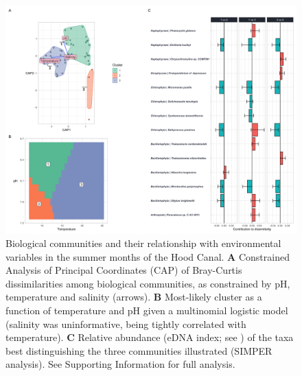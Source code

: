 \documentclass[11pt]{article}
\begin{document}
\begin{linenumbers}
\\




\begin{figure}%
\centering
\includegraphics[width=1\linewidth]{	Figures_for_MS/Figure2.2020-09-03.png}
\caption{\footnotesize{Biological communities and their relationship with environmental variables in the summer months of the Hood Canal. \textbf{A} Constrained Analysis of Principal Coordinates (CAP) of Bray-Curtis dissimilarities among biological communities, as constrained by pH, temperature and salinity (arrows). \textbf{B} Most-likely cluster as a function of temperature and pH given a multinomial logistic model (salinity was uninformative, being tightly correlated with temperature). \textbf{C} Relative abundance (eDNA index; see \cite{kelly2019understanding}) of the taxa best distinguishing the three communities illustrated (SIMPER analysis). See Supporting Information for full analysis.}}
\label{fig:Fig2}
\end{figure}





\end{linenumbers}
\end{document}

